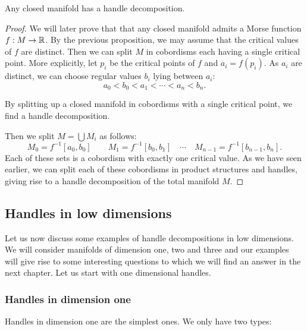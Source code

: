 \begin{theorem}
    Any closed manifold has a handle decomposition.
\end{theorem}
\begin{proof}
    We will later prove that that any closed manifold admits a Morse function $f: M \to  \mathbb{R}$.
    By the previous proposition, we may assume that the critical values of $f$ are distinct.
    Then we can split $M$ in cobordisms each having a single critical point. 
    More explicitly, let $p_i$ be the critical points of  $f$ and  $a_i = f(p_i)$.
    As $a_i$ are distinct, we can choose regular values $b_i$ lying between $a_i$:
     \[
    a_0 < b_0 < a_1 < \cdots < a_n < b_n
    .\] 
    \begin{marginfigure}[-3cm]
        \centering
        \caption{By splitting up a closed manifold in cobordisms with a single critical point, we find a handle decomposition.}
        \label{fig:any-closed-manifold-admits-a-handlebody-decomposition}
    \end{marginfigure}
    Then we split $M = \bigcup M_i$ as follows:
     \[
         M_0 = f^{-1}[a_0, b_0]\qquad
         M_1 = f^{-1}[b_0, b_1]\quad
         \cdots
         \quad
         M_{n-1} = f^{-1}[b_{n-1}, b_n]
    .\] 
    Each of these sets is a cobordism with exactly one critical value.
    As we have seen earlier, we can split each of these cobordisms in product structures and handles, giving rise to a handle decomposition of the total manifold $M$.
\end{proof}


\subsection*{Handles in low dimensions}

Let us now discuss some examples of handle decompositions in low dimensions.
We will consider manifolds of dimension one, two and three and our examples will give rise to some interesting questions to which we will find an answer in the next chapter.
Let us start with one dimensional handles.


\newcommand\smallstrutt{\rule[-0.5cm]{0pt}{1.1cm}}
\subsubsection*{Handles in dimension one}
Handles in dimension one are the simplest ones.
We only have two types:

